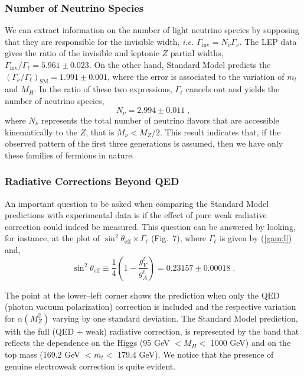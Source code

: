 \documentclass[12pt]{report}
\def\text#1{{\scriptstyle\mathrm{#1}}}
\begin{document}
\subsubsection{Number of Neutrino Species} \indent

We can extract information on the number of light neutrino species by
supposing that they are responsible for the invisible width, {\it
i.e.} $\Gamma_{\text{inv}} = N_\nu  \Gamma_\nu$. The LEP data
\cite{Lep:99} gives the ratio of the invisible and leptonic $Z$
partial widths, $\Gamma_{\text{inv}}/\Gamma_\ell = 5.961 \pm
0.023$. On the other hand, Standard Model predicts the
$(\Gamma_\nu/\Gamma_\ell)_{\text{SM}} = 1.991 \pm 0.001$, where the
error is associated to the variation of $m_t$ and $M_H$. In the ratio
of these two expressions, $\Gamma_\ell$ cancels out and yields the
number of neutrino species,
\[
N_\nu = 2.994 \pm 0.011 \; ,
\]
where $N_\nu$ represents the total number of neutrino flavors that
are accessible kinematically to the $Z$, that is $M_\nu < M_Z/2$.
This result  indicates that, if the observed pattern of the first
three generations is assumed, then we have only these families of
fermions in nature.  


\subsubsection{Radiative Corrections Beyond QED}\indent

An important question to be asked when comparing the Standard Model
predictions with experimental data is if the effect of pure weak
radiative correction  could indeed be measured.  This question can be
answered by looking, for instance, at the plot of $\sin^2
\theta_{\text{eff}} \times \Gamma_\ell$ (Fig.\ 7), where
$\Gamma_\ell$ is given by (\ref{gam:l}) and, 
\[
{\sin^2 \theta_{\text{eff}}} \equiv \frac{1}{4} 
\left(1 - \frac{g_V^\ell}{g_A^\ell} \right) = 0.23157 \pm 0.00018 \; .
\]

The point at the lower--left corner shows the prediction when only
the QED (photon vacuum polarization) correction is included and the
respective variation for $\alpha(M_Z^2)$ varying by one standard
deviation. The Standard Model prediction, with the full (QED + weak)
radiative correction, is represented by the band that reflects the
dependence on the Higgs (95 GeV $< M_H <$ 1000 GeV) and on the top
mass (169.2 GeV $< m_t <$ 179.4  GeV). We notice that the presence of
genuine electroweak correction is quite evident. 
\end{document}
